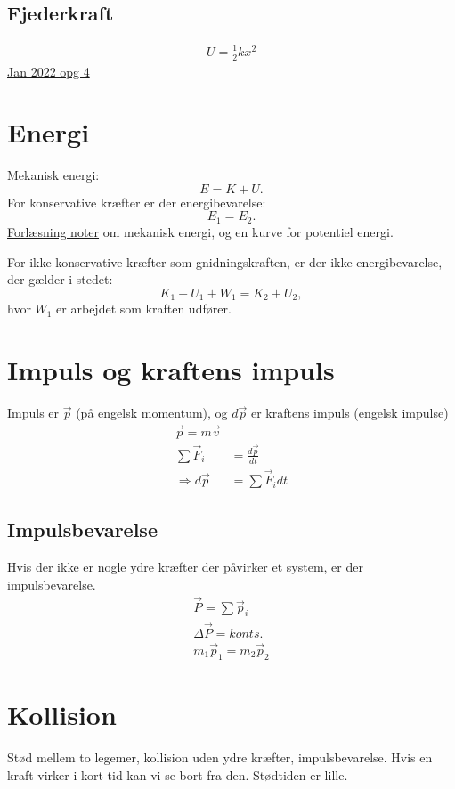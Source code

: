 \documentclass[a4paper,oneside,article]{memoir}
\begin{document}
\subsection{Fjederkraft}
\begin{align*}
    U = \frac{1}{2}kx^2
\end{align*}
\hyperref[asc:Jan 2022 opg 4]{Jan 2022 opg 4}

\section{Energi} \label{sc:energi}
Mekanisk energi: \[E = K + U.\]
For konservative kræfter er der energibevarelse: \[E_1=E_2.\]
\hyperref[fig:mekaniskenergi1]{Forlæsning noter} om mekanisk energi, og en kurve for potentiel energi. 

For ikke konservative kræfter som gnidningskraften, er der ikke energibevarelse, der gælder i stedet: \[K_1+U_1+W_1=K_2+U_2,\] hvor $W_1$ er arbejdet som kraften udfører. 

\section{Impuls og kraftens impuls} \label{sc:impuls} 
Impuls er $\Vec{p}$ (på engelsk momentum), og $d\Vec{p}$ er kraftens impuls (engelsk impulse) 
\begin{align*}
    \Vec{p} = m\Vec{v} \\
    \sum \Vec{F}_i &= \frac{d\Vec{p}}{dt} \\
    \Rightarrow d\Vec{p} &= \sum \Vec{F}_idt
\end{align*}
\subsection{Impulsbevarelse} \label{scc:impulsbevarelse}
Hvis der ikke er nogle ydre kræfter der påvirker et system, er der impulsbevarelse. 
\begin{align*}
    \Vec{P}=\sum\Vec{p}_i \\
    \Delta \Vec{P}=konts. \\
    m_1\Vec{p}_1=m_2\Vec{p}_2
\end{align*}

\section{Kollision} \label{sc:kollision}
Stød mellem to legemer, kollision uden ydre kræfter, impulsbevarelse. 
Hvis en kraft virker i kort tid kan vi se bort fra den. Stødtiden er lille. 
\end{document}

